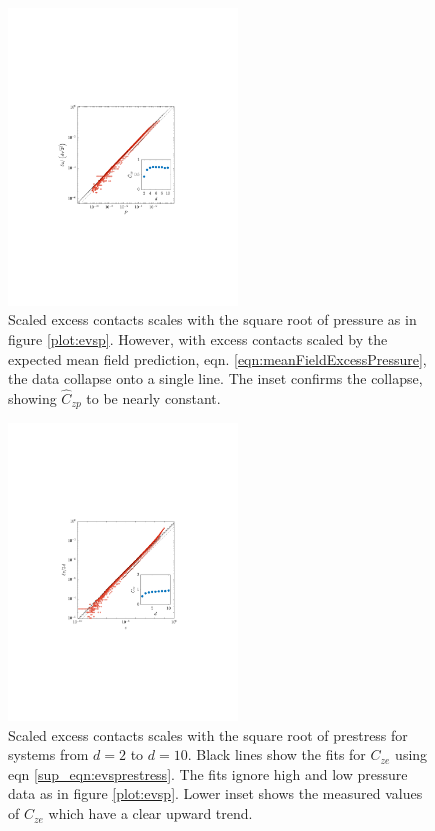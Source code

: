   
\begin{figure}[h!]
    \includegraphics[width=230px, trim=133 242 168 254, clip]{excessContactsScaling/evspcomp.pdf}
   \caption{Scaled excess contacts scales with the square root of pressure as in figure \ref{plot:evsp}. 
    However, with excess contacts scaled by the expected mean field prediction, eqn. \ref{eqn:meanFieldExcessPressure},
    the data collapse onto a single line. The inset confirms the collapse, showing $\hat{C}_{zp}$ to be nearly constant.}
     \label{plot:evspcomp}
\end{figure}
\begin{figure}[h!]
    \includegraphics[width=230px, trim=143 240 163 250, clip]{excessContactsScaling/prestressvse.pdf}
    \caption{Scaled excess contacts scales with the square root of prestress for systems from $d=2$ to $d=10$. Black lines show the fits for $C_{ze}$ using eqn \ref{sup_eqn:evsprestress}. The fits ignore high and low pressure data as in figure \ref{plot:evsp}. 
    Lower inset shows the measured values of $C_{ze}$ which have a clear upward trend.}
    \label{plot:evsprestress}
\end{figure}

